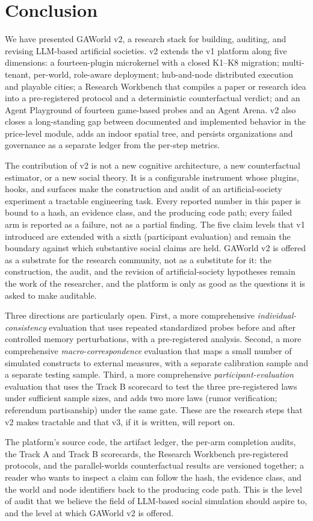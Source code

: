\section{Conclusion}
\label{sec:conclusion}

We have presented GAWorld v2, a research stack for building, auditing, and
revising LLM-based artificial societies.  v2 extends the v1 platform along
five dimensions: a fourteen-plugin microkernel with a closed K1--K8
migration; multi-tenant, per-world, role-aware deployment; hub-and-node
distributed execution and playable cities; a Research Workbench that
compiles a paper or research idea into a pre-registered protocol and a
deterministic counterfactual verdict; and an Agent Playground of fourteen
game-based probes and an Agent Arena.  v2 also closes a long-standing gap
between documented and implemented behavior in the price-level module,
adds an indoor spatial tree, and persists organizations and governance as
a separate ledger from the per-step metrics.

The contribution of v2 is not a new cognitive architecture, a new
counterfactual estimator, or a new social theory.  It is a configurable
instrument whose plugins, hooks, and surfaces make the construction and
audit of an artificial-society experiment a tractable engineering task.
Every reported number in this paper is bound to a hash, an evidence
class, and the producing code path; every failed arm is reported as a
failure, not as a partial finding.  The five claim levels that v1
introduced are extended with a sixth (participant evaluation) and remain
the boundary against which substantive social claims are held.  GAWorld
v2 is offered as a substrate for the research community, not as a
substitute for it: the construction, the audit, and the revision of
artificial-society hypotheses remain the work of the researcher, and the
platform is only as good as the questions it is asked to make auditable.

Three directions are particularly open.  First, a more comprehensive
\emph{individual-consistency} evaluation that uses repeated standardized
probes before and after controlled memory perturbations, with a
pre-registered analysis.  Second, a more comprehensive
\emph{macro-correspondence} evaluation that maps a small number of
simulated constructs to external measures, with a separate calibration
sample and a separate testing sample.  Third, a more comprehensive
\emph{participant-evaluation} evaluation that uses the Track B scorecard
to test the three pre-registered laws under sufficient sample sizes,
and adds two more laws (rumor verification; referendum partisanship)
under the same gate.  These are the research steps that v2 makes
tractable and that v3, if it is written, will report on.

The platform's source code, the artifact ledger, the per-arm
completion audits, the Track A and Track B scorecards, the Research
Workbench pre-registered protocols, and the parallel-worlds counterfactual
results are versioned together; a reader who wants to inspect a claim can
follow the hash, the evidence class, and the world and node identifiers
back to the producing code path.  This is the level of audit that we
believe the field of LLM-based social simulation should aspire to, and
the level at which GAWorld v2 is offered.
